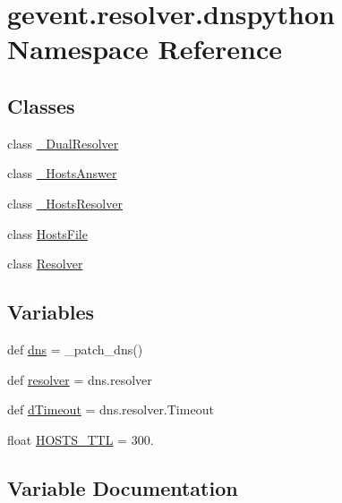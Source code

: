 \hypertarget{namespacegevent_1_1resolver_1_1dnspython}{}\section{gevent.\+resolver.\+dnspython Namespace Reference}
\label{namespacegevent_1_1resolver_1_1dnspython}
\subsection*{Classes}
\begin{DoxyCompactItemize}
\item 
class \hyperlink{classgevent_1_1resolver_1_1dnspython_1_1___dual_resolver}{\+\_\+\+Dual\+Resolver}
\item 
class \hyperlink{classgevent_1_1resolver_1_1dnspython_1_1___hosts_answer}{\+\_\+\+Hosts\+Answer}
\item 
class \hyperlink{classgevent_1_1resolver_1_1dnspython_1_1___hosts_resolver}{\+\_\+\+Hosts\+Resolver}
\item 
class \hyperlink{classgevent_1_1resolver_1_1dnspython_1_1_hosts_file}{Hosts\+File}
\item 
class \hyperlink{classgevent_1_1resolver_1_1dnspython_1_1_resolver}{Resolver}
\end{DoxyCompactItemize}
\subsection*{Variables}
\begin{DoxyCompactItemize}
\item 
def \hyperlink{namespacegevent_1_1resolver_1_1dnspython_a11d6b8fef4b47146a48b4397abed32bf}{dns} = \+\_\+patch\+\_\+dns()
\item 
def \hyperlink{namespacegevent_1_1resolver_1_1dnspython_ae6c2363b41469ed5b70618cee2fb5d22}{resolver} = dns.\+resolver
\item 
def \hyperlink{namespacegevent_1_1resolver_1_1dnspython_a7af93024bc49b7db49b7d53a40e462b2}{d\+Timeout} = dns.\+resolver.\+Timeout
\item 
float \hyperlink{namespacegevent_1_1resolver_1_1dnspython_a2f3664e0e02442df0612ce6e8dd65e1b}{H\+O\+S\+T\+S\+\_\+\+T\+TL} = 300.
\end{DoxyCompactItemize}


\subsection{Variable Documentation}
\mbox{\label{namespacegevent_1_1resolver_1_1dnspython_a11d6b8fef4b47146a48b4397abed32bf}} 
